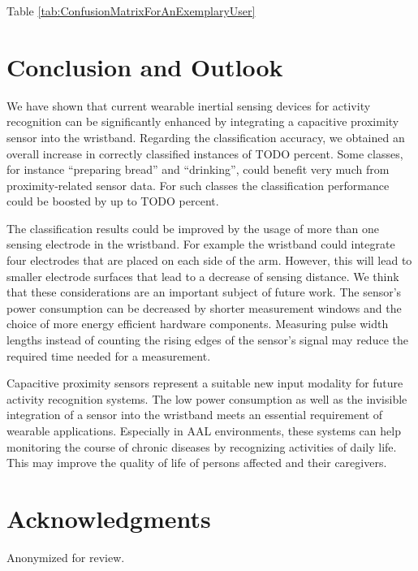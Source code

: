 \documentclass[runningheads,a4paper]{llncs}
\begin{document}
\begin{table}
	\label{tab:ConfusionMatrixForAnExemplaryUser}
\end{table}

Table \ref{tab:ConfusionMatrixForAnExemplaryUser} 

\section{Conclusion and Outlook}
\label{sect:conclusions}

We have shown that current wearable inertial sensing devices for activity recognition can be significantly enhanced by integrating a capacitive proximity sensor into the wristband. Regarding the classification accuracy, we obtained an overall increase in correctly classified instances of TODO percent. Some classes, for instance ``preparing bread'' and ``drinking'', could benefit very much from proximity-related sensor data. For such classes the classification performance could be boosted by up to TODO percent. 

The classification results could be improved by the usage of more than one sensing electrode in the wristband. For example the wristband could integrate four electrodes that are placed on each side of the arm. However, this will lead to smaller electrode surfaces that lead to a decrease of sensing distance. We think that these considerations are an important subject of future work. The sensor's power consumption can be decreased by shorter measurement windows and the choice of more energy efficient hardware components. Measuring pulse width lengths instead of counting the rising edges of the sensor's signal may reduce the required time needed for a measurement.

Capacitive proximity sensors represent a suitable new input modality for future activity recognition systems. The low power consumption as well as the invisible integration of a sensor into the wristband meets an essential requirement of wearable applications. Especially in AAL environments, these systems can help monitoring the course of chronic diseases by recognizing activities of daily life. This may improve the quality of life of persons affected and their caregivers. 

\section*{Acknowledgments}

Anonymized for review.





\end{document}
